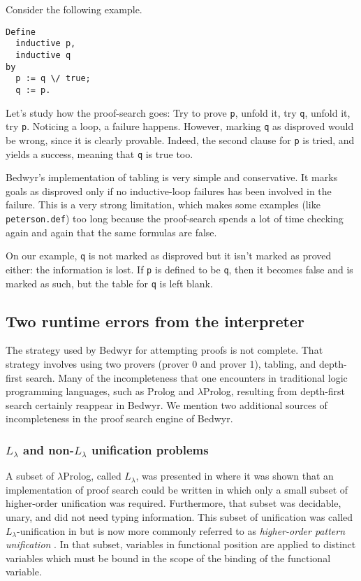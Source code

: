 \documentclass{article}
\providecommand{\texorpdfstring}[2]{#1}
\newcommand{\lp}{$\lambda$Prolog}
\newcommand{\Ll}{$L_\lambda$}
\begin{document}
Consider the following example.
\begin{verbatim}
Define
  inductive p,
  inductive q
by
  p := q \/ true;
  q := p.
\end{verbatim}

Let's study how the proof-search goes:
Try to prove \verb.p., unfold it, try \verb.q., unfold it, try \verb.p..
Noticing a loop, a failure happens.
However, marking \verb.q. as disproved would be wrong,
since it is clearly provable.
Indeed, the second clause for \verb.p. is tried, and yields a
success, meaning that \verb.q. is true too.

Bedwyr's implementation of tabling is very simple and conservative.
It marks goals as
disproved only if no inductive-loop failures has been involved in the failure.
This is a very strong limitation, which makes some examples (like
\verb+peterson.def+) too long because the proof-search spends a lot of time
checking again and again that the same formulas are false.

On our example, \verb.q. is not marked as disproved
but it isn't marked as proved either: the information is lost.
If \verb.p. is defined to be \verb.q.,
then it becomes false and is marked as such,
but the table for \verb.q. is left blank.

\subsection{Two runtime errors from the interpreter}

The strategy used by Bedwyr for attempting proofs is not complete.
That strategy involves using two provers (prover 0 and prover 1),
tabling, and depth-first search.
Many of the incompleteness that one encounters in
traditional logic programming languages, such as Prolog and \lp{},
resulting from depth-first search certainly reappear in Bedwyr.  We
mention two additional sources of incompleteness in the proof search
engine of Bedwyr.

\subsubsection{\texorpdfstring{\Ll{}}{Llambda} and non-\texorpdfstring{\Ll{}}{Llambda} unification problems}
A subset of \lp, called \Ll, was presented in \cite{miller91jlc} where
it was shown that an implementation of proof search could be written
in which only a small subset of higher-order unification was required.
Furthermore, that subset was decidable, unary, and did not need typing
information.  This subset of unification was called \Ll-unification in
\cite{miller91jlc} but is now more commonly referred to as {\em
  higher-order pattern unification}
\cite{nipkow93lics,nadathur05iclp}.  In that subset, variables in
functional position are applied to distinct variables which must be
bound in the scope of the binding of the functional variable.
\end{document}
